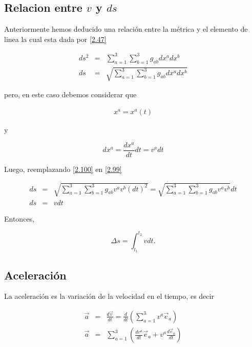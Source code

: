 \documentclass[12pt]{report}
\begin{document}
\subsection{Relacion entre $v$ y $ds$}


Anteriormente hemos deducido una relación entre la métrica y el elemento de linea la cual esta dada por \eqref{2.47} 


\begin{eqnarray} \nonumber
ds^2 &=&  \sum_{a=1}^3 \sum_{b=1}^3 g_{ab} dx^a dx^b \\ \label{2.99}
ds &=& \sqrt{\sum_{a=1}^3 \sum_{b=1}^3 g_{ab} dx^a dx^b }
\end{eqnarray}


pero, en este caso debemos considerar que 

\begin{eqnarray} \nonumber
x^a = x^a(t) 
\end{eqnarray}

y 

\begin{equation} \label{2.100}
dx^a=\frac{dx^a}{dt}dt = v^a dt
\end{equation}

Luego, reemplazando \eqref{2.100} en \eqref{2.99}

\begin{eqnarray} \nonumber
ds &=& \sqrt{\sum_{a=1}^3 \sum_{b=1}^3 g_{ab} v^a v^b (dt)^2 } = \sqrt{\sum_{a=1}^3 \sum_{b=1}^3 g_{ab} v^a v^b }  dt \\
ds &=& vdt 
\end{eqnarray}
 
 Entonces,
 
 
\begin{equation} \label{2.102}
\Delta s = \displaystyle\int_{t_1}^{t_2} vdt.
\end{equation}



\subsection{Aceleración}

La aceleración es la variación de la velocidad en el tiempo, es decir 


\begin{eqnarray} \nonumber
\vec{a}&=&\frac{d\vec{v}}{dt} = \frac{d}{dt} \left( \sum_{a=1}^3 v^a  \vec{e}_a \right) \\ \label{2.103}
\vec{a} &=& \sum_{a=1}^3 \left( \frac{dv^a}{dt}\vec{e}_a + v^a \frac{d\vec{e}_a}{dt} \right)
\end{eqnarray}
\end{document}
